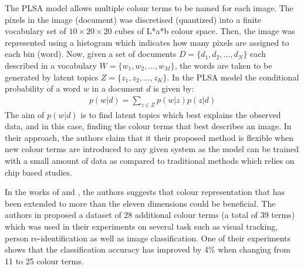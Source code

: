 The PLSA model allows multiple colour terms to be named for each image. The pixels in the image (document) was discretised (quantized) into a finite vocabulary set of $10 \times 20 \times 20$ cubes of L*a*b colour space. Then, the image was represented using a histogram which indicates how many pixels are assigned to each bin (word). Now, given a set of documents $D = \{d_1, d_2, ... , d_N\}$ each described in a vocabulary $W = \{w_1, w_2, ... , w_M\}$, the words are taken to be generated by latent topics $Z = \{z_1, z_2, ... , z_K\}$. In the PLSA model the conditional probability of a word $w$ in a document $d$ is given by:
\begin{align}
    p(w|d) = \sum_{z\in Z}{p(w|z)p(z|d)}
\end{align}
The aim of $p(w|d)$ is to find latent topics which best explains the observed data, and in this case, finding the colour terms that best describes an image. In their approach, the authors claim that it their proposed method is flexible when new colour terms are introduced to any given system as the model can be trained with a small amount of data as compared to traditional methods which relies on chip based studies. 

In the works of  and , the authors suggests that colour representation that has been extended to more than the eleven dimensions could be beneficial. The authors in \cite{yu2018beyond} proposed a dataset of 28 additional colour terms (a total of 39 terms) which was used in their experiments on several task such as visual tracking, person re-identification as well as image classification. One of their experiments shows that the classification accuracy has improved by 4\% when changing from 11 to 25 colour terms. 



